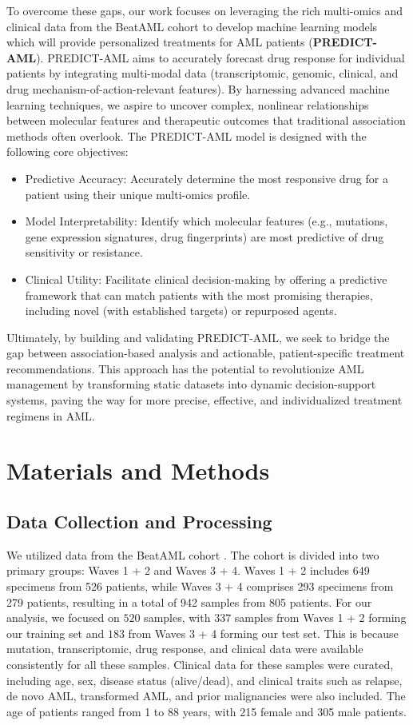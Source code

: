 \documentclass[pdflatex,sn-mathphys-num]{sn-jnl}%
\theoremstyle{thmstyleone}%
\theoremstyle{thmstyletwo}%
\theoremstyle{thmstylethree}%
\begin{document}
To overcome these gaps, our work focuses on leveraging the rich multi-omics and clinical data from the BeatAML cohort to develop machine learning models \cite{lecun2015deep} which will provide personalized treatments for AML patients (\textbf{PREDICT-AML}).
PREDICT-AML aims to accurately forecast drug response for individual patients by integrating multi-modal data (transcriptomic, genomic, clinical, and drug mechanism-of-action-relevant features). By harnessing advanced machine learning techniques, we aspire to uncover complex, nonlinear relationships between molecular features and therapeutic outcomes that traditional association methods often overlook. The PREDICT-AML model is designed with the following core objectives:
\begin{itemize}
    \item Predictive Accuracy: Accurately determine the most responsive drug for a patient using their unique multi-omics profile.
    \item Model Interpretability: Identify which molecular features (e.g., mutations, gene expression signatures, drug fingerprints) are most predictive of drug sensitivity or resistance.
    \item Clinical Utility: Facilitate clinical decision-making by offering a predictive framework that can match patients with the most promising therapies, including novel (with established targets) or repurposed agents.
\end{itemize}

Ultimately, by building and validating PREDICT-AML, we seek to bridge the gap between association-based analysis and actionable, patient-specific treatment recommendations. This approach has the potential to revolutionize AML management by transforming static datasets into dynamic decision-support systems, paving the way for more precise, effective, and individualized treatment regimens in AML.

\section{Materials and Methods}\label{sec2}
\subsection{Data Collection and Processing} 
We utilized data from the BeatAML cohort \cite{bottomly2022integrative}. The cohort is divided into two primary groups: Waves 1 + 2 and Waves 3 + 4. Waves 1 + 2 includes 649 specimens from 526 patients, while Waves 3 + 4 comprises 293 specimens from 279 patients, resulting in a total of 942 samples from 805 patients. For our analysis, we focused on $520$ samples, with $337$ samples from Waves 1 + 2 forming our training set and $183$ from Waves 3 + 4 forming our test set. This is because mutation, transcriptomic, drug response, and clinical data were available consistently for all these samples. Clinical data for these samples were curated, including age, sex, disease status (alive/dead), and clinical traits such as relapse, de novo AML, transformed AML, and prior malignancies were also included. The age of patients ranged from 1 to 88 years, with 215 female and 305 male patients. 
\end{document}
